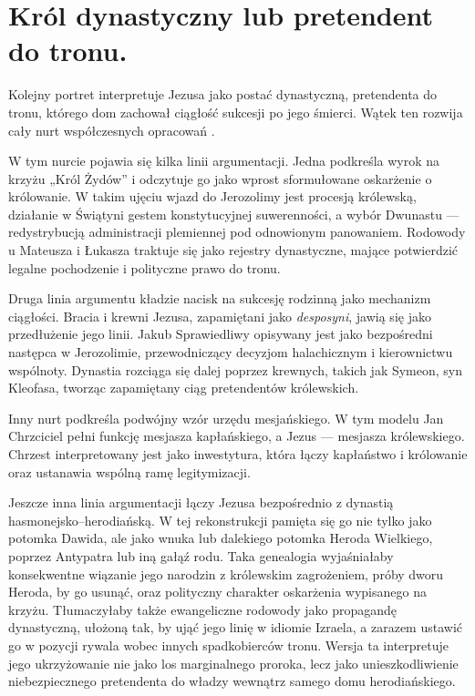 \section{Król dynastyczny lub pretendent do tronu.}

\label{sec:dynastic}

Kolejny portret interpretuje Jezusa jako postać dynastyczną, pretendenta do tronu, którego dom zachował ciągłość sukcesji po jego śmierci.
Wątek ten rozwija cały nurt współczesnych opracowań \cite{tabor:dynasty,eisenman:james,maccoby:revolution,thiering:jesusman,jacobovici:tomb,baigent:holyblood}.

W tym nurcie pojawia się kilka linii argumentacji.
Jedna podkreśla wyrok na krzyżu „Król Żydów” i odczytuje go jako wprost sformułowane oskarżenie o królowanie.
W takim ujęciu wjazd do Jerozolimy jest procesją królewską, działanie w Świątyni gestem konstytucyjnej suwerenności, a wybór Dwunastu — redystrybucją administracji plemiennej pod odnowionym panowaniem.
Rodowody u Mateusza i Łukasza traktuje się jako rejestry dynastyczne, mające potwierdzić legalne pochodzenie i polityczne prawo do tronu.

Druga linia argumentu kładzie nacisk na sukcesję rodzinną jako mechanizm ciągłości.
Bracia i krewni Jezusa, zapamiętani jako \emph{desposyni}, jawią się jako przedłużenie jego linii.
Jakub Sprawiedliwy opisywany jest jako bezpośredni następca w Jerozolimie, przewodniczący decyzjom halachicznym i kierownictwu wspólnoty.
Dynastia rozciąga się dalej poprzez krewnych, takich jak Symeon, syn Kleofasa, tworząc zapamiętany ciąg pretendentów królewskich.

Inny nurt podkreśla podwójny wzór urzędu mesjańskiego.
W tym modelu Jan Chrzciciel pełni funkcję mesjasza kapłańskiego, a Jezus — mesjasza królewskiego.
Chrzest interpretowany jest jako inwestytura, która łączy kapłaństwo i królowanie oraz ustanawia wspólną ramę legitymizacji.

Jeszcze inna linia argumentacji łączy Jezusa bezpośrednio z dynastią hasmonejsko–herodiańską.
W tej rekonstrukcji pamięta się go nie tylko jako potomka Dawida, ale jako wnuka lub dalekiego potomka Heroda Wielkiego, poprzez Antypatra lub iną gałąź rodu.
Taka genealogia wyjaśniałaby konsekwentne wiązanie jego narodzin z królewskim zagrożeniem, próby dworu Heroda, by go usunąć, oraz polityczny charakter oskarżenia wypisanego na krzyżu.
Tłumaczyłaby także ewangeliczne rodowody jako propagandę dynastyczną, ułożoną tak, by ująć jego linię w idiomie Izraela, a zarazem ustawić go w pozycji rywala wobec innych spadkobierców tronu.
Wersja ta interpretuje jego ukrzyżowanie nie jako los marginalnego proroka, lecz jako unieszkodliwienie niebezpiecznego pretendenta do władzy wewnątrz samego domu herodiańskiego.

